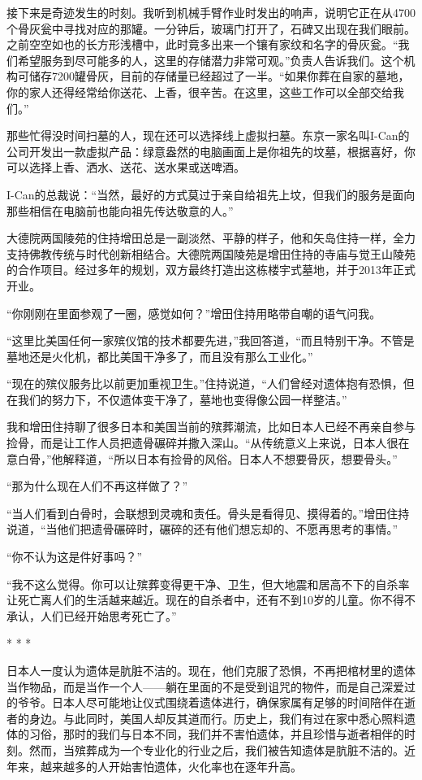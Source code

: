 \documentclass[12pt,oneside]{book}
\begin{document}
接下来是奇迹发生的时刻。我听到机械手臂作业时发出的响声，说明它正在从4700个骨灰瓮中寻找对应的那罐。一分钟后，玻璃门打开了，石碑又出现在我们眼前。之前空空如也的长方形浅槽中，此时竟多出来一个镶有家纹和名字的骨灰瓮。“我们希望服务到尽可能多的人，这里的存储潜力非常可观。”负责人告诉我们。这个机构可储存7200罐骨灰，目前的存储量已经超过了一半。“如果你葬在自家的墓地，你的家人还得经常给你送花、上香，很辛苦。在这里，这些工作可以全部交给我们。”

那些忙得没时间扫墓的人，现在还可以选择线上虚拟扫墓。东京一家名叫I-Can的公司开发出一款虚拟产品：绿意盎然的电脑画面上是你祖先的坟墓，根据喜好，你可以选择上香、洒水、送花、送水果或送啤酒。

I-Can的总裁说：“当然，最好的方式莫过于亲自给祖先上坟，但我们的服务是面向那些相信在电脑前也能向祖先传达敬意的人。”

大德院两国陵苑的住持增田总是一副淡然、平静的样子，他和矢岛住持一样，全力支持佛教传统与时代创新相结合。大德院两国陵苑是增田住持的寺庙与觉王山陵苑的合作项目。经过多年的规划，双方最终打造出这栋楼宇式墓地，并于2013年正式开业。

“你刚刚在里面参观了一圈，感觉如何？”增田住持用略带自嘲的语气问我。

“这里比美国任何一家殡仪馆的技术都要先进，”我回答道，“而且特别干净。不管是墓地还是火化机，都比美国干净多了，而且没有那么工业化。”

“现在的殡仪服务比以前更加重视卫生。”住持说道，“人们曾经对遗体抱有恐惧，但在我们的努力下，不仅遗体变干净了，墓地也变得像公园一样整洁。”

我和增田住持聊了很多日本和美国当前的殡葬潮流，比如日本人已经不再亲自参与捡骨，而是让工作人员把遗骨碾碎并撒入深山。“从传统意义上来说，日本人很在意白骨，”他解释道，“所以日本有捡骨的风俗。日本人不想要骨灰，想要骨头。”

“那为什么现在人们不再这样做了？”

“当人们看到白骨时，会联想到灵魂和责任。骨头是看得见、摸得着的。”增田住持说道，“当他们把遗骨碾碎时，碾碎的还有他们想忘却的、不愿再思考的事情。”

“你不认为这是件好事吗？”

“我不这么觉得。你可以让殡葬变得更干净、卫生，但大地震和居高不下的自杀率让死亡离人们的生活越来越近。现在的自杀者中，还有不到10岁的儿童。你不得不承认，人们已经开始思考死亡了。”
\begin{center}
* * *
\end{center}

日本人一度认为遗体是肮脏不洁的。现在，他们克服了恐惧，不再把棺材里的遗体当作物品，而是当作一个人——躺在里面的不是受到诅咒的物件，而是自己深爱过的爷爷。日本人尽可能地让仪式围绕着遗体进行，确保家属有足够的时间陪伴在逝者的身边。与此同时，美国人却反其道而行。历史上，我们有过在家中悉心照料遗体的习俗，那时的我们与日本不同，我们并不害怕遗体，并且珍惜与逝者相伴的时刻。然而，当殡葬成为一个专业化的行业之后，我们被告知遗体是肮脏不洁的。近年来，越来越多的人开始害怕遗体，火化率也在逐年升高。
\end{document}
